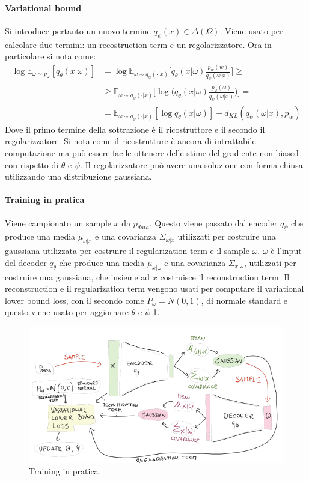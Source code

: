 		\paragraph{Variational bound}
		Si introduce pertanto un nuovo termine $q_\psi(x)\in\Delta(\Omega)$.
		Viene usato per calcolare due termini: un recostruction term e un regolarizzatore.
		Ora in particolare si nota come:
		\begin{align*}
			\log\mathbb{E}_{\omega\sim p_\omega} [q_\theta(x|\omega)] &= \log\mathbb{E}_{\omega\sim q_\psi(\cdot|x)}\bigl[q_\theta(x|\omega)\frac{p_w(w)}{q_\psi(\omega|x)}\bigr]\ge\\
			&\ge \mathbb{E}_{\omega\sim q_\psi(\cdot|x)}\bigl[\log\bigl(q_\theta(x|\omega)\frac{p_\omega(\omega)}{q_\psi(\omega|x)}\bigr)\bigr]=\\
			&=\mathbb{E}_{\omega\sim q_\psi(\cdot|x)}[\log q_\theta(x|\omega)] - d_{KL}(q_\psi(\omega|x), p_w)
		\end{align*}
		Dove il primo termine della sottrazione \`e il ricostruttore e il secondo il regolarizzatore.
		Si nota come il ricostrutture \`e ancora di intrattabile computazione ma pu\`o essere facile ottenere delle stime del gradiente non biased con rispetto di $\theta$ e $\psi$.
		Il regolarizzatore pu\`o avere una soluzione con forma chiusa utilizzando una distribuzione gaussiana.
		
		\paragraph{Training in pratica}
		Viene campionato un sample $x$ da $p_{data}$.
		Questo viene passato dal encoder $q_\psi$ che produce una media $\mu_{\omega|x}$ e una covarianza $\Sigma_{\omega|x}$ utilizzati per costruire una gaussiana utilizzata per costruire il regularization term e il sample $\omega$.
		$\omega$ \`e l'input del decoder $q_\theta$ che produce una media $\mu_{x|\omega}$ e una covarianza $\Sigma_{x|\omega}$, utilizzati per costruire una gaussiana, che insieme ad $x$ costruisce il reconstruction term.
		Il reconstruction e il regularization term vengono usati per computare il variational lower bound loss, con il secondo come $P_\omega = N(0,1)$, di normale standard e questo viene usato per aggiornare $\theta$ e $\psi$ \ref{fig:chapter12-14}.
		
		\begin{figure}
			\centering
			\includegraphics[width=0.8\linewidth]{imgs/chapter12/img14}
			\caption{Training in pratica}
			\label{fig:chapter12-14}
		\end{figure}
